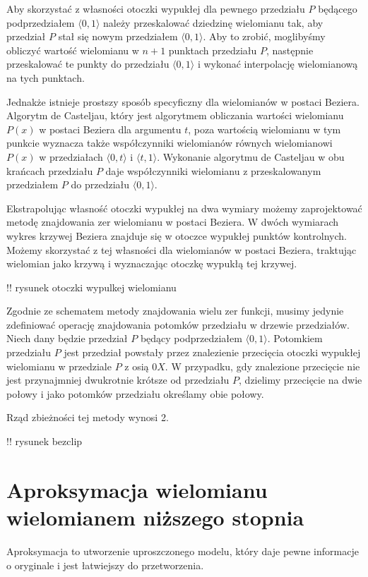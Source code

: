 \documentclass{article}
\begin{document}
Aby skorzystać z własności otoczki wypukłej dla pewnego przedziału $P$ będącego podprzedziałem $\langle 0, 1 \rangle$ należy przeskalować dziedzinę wielomianu tak, aby przedział $P$ stał się nowym przedziałem $\langle 0, 1 \rangle$. Aby to zrobić, moglibyśmy obliczyć wartość wielomianu w $n+1$ punktach przedziału $P$, następnie przeskalować te punkty do przedziału $\langle 0, 1 \rangle$ i wykonać interpolację wielomianową na tych punktach.

Jednakże istnieje prostszy sposób specyficzny dla wielomianów w postaci Beziera. Algorytm de Casteljau, który jest algorytmem obliczania wartości wielomianu $P(x)$ w postaci Beziera dla argumentu $t$, poza wartością wielomianu w tym punkcie wyznacza także współczynniki wielomianów równych wielomianowi $P(x)$ w przedziałach $\langle 0, t \rangle$ i $\langle t, 1 \rangle$. Wykonanie algorytmu de Casteljau w obu krańcach przedziału $P$ daje współczynniki wielomianu z przeskalowanym przedziałem $P$ do przedziału $\langle 0, 1 \rangle$.

Ekstrapolując własność otoczki wypukłej na dwa wymiary możemy zaprojektować metodę znajdowania zer wielomianu w postaci Beziera. W dwóch wymiarach wykres krzywej Beziera znajduje się w otoczce wypukłej punktów kontrolnych. Możemy skorzystać z tej własności dla wielomianów w postaci Beziera, traktując wielomian jako krzywą i wyznaczając otoczkę wypukłą tej krzywej.

!! rysunek otoczki wypulkej wielomianu

Zgodnie ze schematem metody znajdowania wielu zer funkcji, musimy jedynie zdefiniować operację znajdowania potomków przedziału w drzewie przedziałów. Niech dany będzie przedział $P$ będący podprzedziałem $\langle 0, 1 \rangle$. Potomkiem przedziału $P$ jest przedział powstały przez znalezienie przecięcia otoczki wypukłej wielomianu w przedziale $P$ z osią $0X$. W przypadku, gdy znalezione przecięcie nie jest przynajmniej dwukrotnie krótsze od przedziału $P$, dzielimy przecięcie na dwie połowy i jako potomków przedziału określamy obie połowy.

Rząd zbieżności tej metody wynosi 2.

!! rysunek bezclip

\section{Aproksymacja wielomianu wielomianem niższego stopnia}

Aproksymacja to utworzenie uproszczonego modelu, który daje pewne informacje o oryginale i jest łatwiejszy do przetworzenia.
\end{document}

